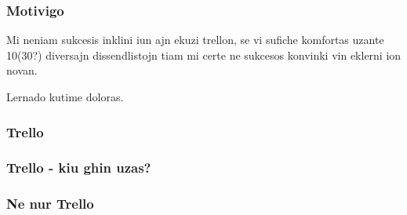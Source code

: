 \documentclass{beamer}
\begin{document}
   
  \begin{frame}
    \frametitle{Motivigo}
    
    Mi neniam sukcesis inklini iun ajn ekuzi trellon, se vi sufiche komfortas uzante 10(30?) diversajn dissendlistojn tiam mi certe ne sukcesos konvinki vin eklerni ion novan.
    
    Lernado kutime doloras.
  \end{frame}



  \begin{frame}
    \frametitle{Trello}
    
    \begin{itemize}
      
    \end{itemize}
    
  \end{frame}
  
  \begin{frame}
    \frametitle{Trello - kiu ghin uzas?}
    
    \begin{itemize}
      
    \end{itemize}
    
  \end{frame}
  
  

  \begin{frame}
    \frametitle{Ne nur Trello}
    
  \end{frame}


\end{document}
